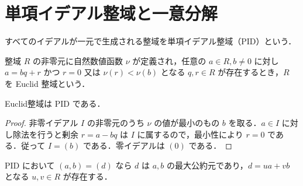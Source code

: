 \section{単項イデアル整域と一意分解}
\begin{defn}[単項イデアル整域]
すべてのイデアルが一元で生成される整域を単項イデアル整域（PID）という．
\end{defn}
\begin{defn}[Euclid整域]
整域 $R$ の非零元に自然数値函数 $\nu$ が定義され，任意の $a\in R,b\ne0$ に対し $a=bq+r$ かつ $r=0$ 又は $\nu(r)<\nu(b)$ となる $q,r\in R$ が存在するとき，$R$ を Euclid 整域という．
\end{defn}
\begin{prop}[Euclid整域の単項性]
Euclid整域は PID である．
\end{prop}
\begin{proof}
非零イデアル $I$ の非零元のうち $\nu$ の値が最小のもの $b$ を取る．$a\in I$ に対し除法を行うと剰余 $r=a-bq$ は $I$ に属するので，最小性により $r=0$ である．従って $I=(b)$ である．零イデアルは $(0)$ である．
\end{proof}
\begin{prop}[最大公約元とBezout等式]
PID において $(a,b)=(d)$ なら $d$ は $a,b$ の最大公約元であり，$d=ua+vb$ となる $u,v\in R$ が存在する．
\end{prop}
